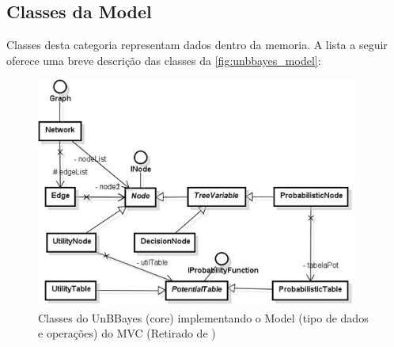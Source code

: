 \subsection{Classes da Model}
Classes desta categoria representam dados dentro da memoria. A lista a seguir oferece uma breve descrição das classes da \autoref{fig:unbbayes_model}:
\begin{figure}[ht]
	\centering
	\includegraphics[width = 400px]{figuras/unbbayes_model}
	\caption[UnBBayes UML MVC]{Classes do UnBBayes (core) implementando o Model (tipo de dados e operações) do MVC (Retirado de \cite{javaApi11})}
	\label{fig:unbbayes_model}
\end{figure}


